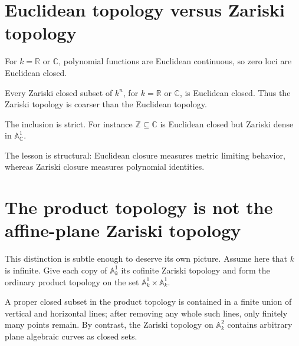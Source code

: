 \section{Euclidean topology versus Zariski topology}
\label{sec:vi02-euclidean}

For \(k=\mathbb R\) or \(\mathbb C\), polynomial functions are Euclidean continuous, so
zero loci are Euclidean closed.

\begin{proposition}
Every Zariski closed subset of \(k^n\), for \(k=\mathbb R\) or \(\mathbb C\), is Euclidean
closed.  Thus the Zariski topology is coarser than the Euclidean topology.
\end{proposition}

The inclusion is strict.  For instance \(\mathbb Z\subseteq\mathbb C\) is Euclidean closed
but Zariski dense in \(\mathbb A^1_{\mathbb C}\).

The lesson is structural: Euclidean closure measures metric limiting behavior, whereas
Zariski closure measures polynomial identities.

\section{The product topology is not the affine-plane Zariski topology}
\label{sec:vi02-product-topology}

This distinction is subtle enough to deserve its own picture.  Assume here that \(k\) is
infinite.  Give each copy of \(\mathbb A_k^1\) its cofinite Zariski topology and form the
ordinary product topology on the set \(\mathbb A_k^1\times\mathbb A_k^1\).

A proper closed subset in the product topology is contained in a finite union of vertical
and horizontal lines; after removing any whole such lines, only finitely many points remain.
By contrast, the Zariski topology on \(\mathbb A_k^2\) contains arbitrary plane algebraic
curves as closed sets.

